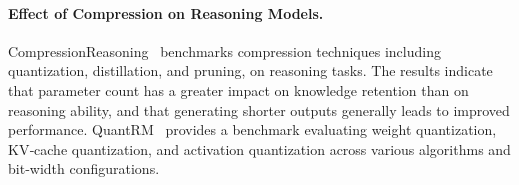 \paragraph{\textbf{Effect of Compression on Reasoning Models.}} CompressionReasoning~\cite{zhang2025reasoning} benchmarks compression techniques including quantization, distillation, and pruning, on reasoning tasks. The results indicate that parameter count has a greater impact on knowledge retention than on reasoning ability, and that generating shorter outputs generally leads to improved performance. QuantRM~\cite{liu2025quantizationhurtsreasoningempirical} provides a benchmark evaluating weight quantization, KV‑cache quantization, and activation quantization across various algorithms and bit‑width configurations.